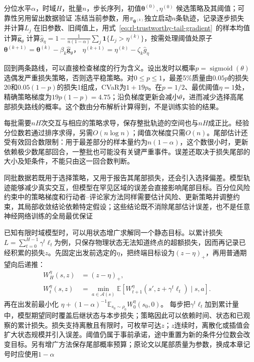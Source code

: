 \begin{algorithm}[累计CVaR的轨迹更新]
  \label{alg:rl-trustworthy-static-cvar}
  \begin{algorithmic}[1]
    \Require 分位水平$\alpha$，时域$H$，批量$n$，步长序列，初值$\bm{\theta}^{(0)},\eta^{(0)}$
    \Ensure 候选策略及其阈值；可靠性另用留出数据验证
      \State 冻结当前参数，用$\pi_{\bm{\theta}^{(k)}}$独立启动$n$条轨迹，记录逐步损失并计算$L_j$
      \State 在旧参数、旧阈值上，用式~\eqref{eq:rl-trustworthy-tail-gradient}~的样本均值计算$\widehat{\bm{g}}_\theta$
      \State 计算$\widehat g_\eta=1-\frac{1}{n(1-\alpha)}\sum_j\mathbf 1\{L_j>\eta^{(k)}\}$，按需处理阈值处原子
      \State $\bm{\theta}^{(k+1)}=\bm{\theta}^{(k)}-\beta_k\widehat{\bm{g}}_\theta$，
        $\eta^{(k+1)}=\eta^{(k)}-\zeta_k\widehat g_\eta$
    \EndFor
  \end{algorithmic}
\end{algorithm}

回到两条路线，可以直接检查梯度的行为含义。设出发时以概率$p=\operatorname{sigmoid}(\theta)$选偶发严重损失策略，否则选平稳策略。对$0\leq p\leq1$，最差5\%质量由$0.05p$的损失20和$0.05(1-p)$的损失1组成，CVaR为$1+19p$。在$p=1/2$、最优阈值$\eta=1$处，精确策略梯度为$19p(1-p)=4.75$；沿负梯度更新会减小$\theta$，进而减少选择高尾部损失路线的概率。这个数由分布解析计算得到，不是训练实验的结果。

每批需要$nH$次交互与相应的策略求导，保存整批轨迹的空间也与$nH$成正比。经验分位数若通过排序求得，另需$O(n\log n)$；阈值次梯度只需$O(n)$。尾部估计还受有效回合数限制：用于最差部分的样本量约为$n(1-\alpha)$，这个数很小时，更新依赖极少数尾部回合，一整批也可能没有关键严重事件。误差还取决于损失尾部的大小及矩条件，不能只由这一回合数判断。

同批数据若既用于选择策略，又用于报告其尾部损失，还会引入选择偏差。模型轨迹能够减少真实交互，但模型在罕见区域的误差会直接影响尾部目标。百分位风险约束中的策略梯度和行动者--评论家方法同样需要估计风险、更新策略并调整约束，其局部收敛结论依赖特定假设；这些结论既不消除尾部估计误差，也不是任意神经网络训练的全局最优保证

已知有限时域模型时，可以用状态增广求解同一个静态目标。以累计损失
$L=\sum_{t=0}^{H-1}\gamma^t\ell_t$为例，只保存物理状态无法知道终点的超额损失，因而再记录已经积累的损失$z$。先固定出发前选定的$\eta$，把终端目标设为$(z-\eta)_+$，再用普通期望向后递推：
\begin{align}
  W_H^\eta(s,z)&=(z-\eta)_+, \nonumber\\
  W_t^\eta(s,z)&=\min_{a\in\mathcal A(s)}
       \mathbb E\!\left[
       W_{t+1}^\eta(s',z+\gamma^t\ell_t)\mid s,a\right].
  \label{eq:rl-trustworthy-augmented-risk}
\end{align}
再在出发前最小化
$\eta+(1-\alpha)^{-1}\mathbb E_{s_0\sim\rho_0}W_0^\eta(s_0,0)$。
每步把$\gamma^t\ell_t$加到累计量中，模型期望同时覆盖后继状态与本步损失；策略因此可以依赖时间、状态和已观察的累计损失。损失支持离散且有限时，可枚举可达$z$；$z$连续时，离散化或插值会扩大状态规模并引入误差。阈值仍属于事前承诺，途中重置为新的条件分位数会改变目标。另有增广方法保存尾部概率预算；原论文以尾部质量为参数，换成本章记号时应使用$1-\alpha$

